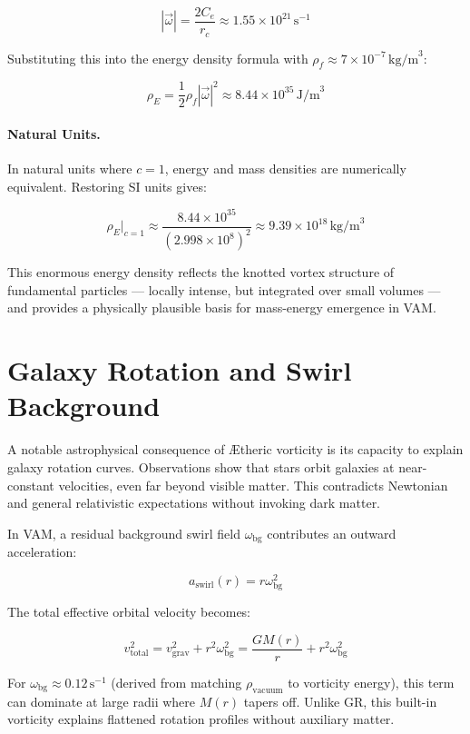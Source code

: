 \documentclass[12pt]{article}
\begin{document}
    \[
        |\vec{\omega}| = \frac{2 C_e}{r_c} \approx 1.55 \times 10^{21} \, \text{s}^{-1}
    \]

    Substituting this into the energy density formula with \( \rho_{\!f} \approx 7 \times 10^{-7} \, \text{kg/m}^3 \):

    \[
        \rho_{\scriptscriptstyle\boldsymbol\!E} = \frac{1}{2} \rho_{\!f} |\vec{\omega}|^2 \approx 8.44 \times 10^{35} \, \text{J/m}^3
    \]

    \paragraph{Natural Units.}
    In natural units where \( c = 1 \), energy and mass densities are numerically equivalent. Restoring SI units gives:

    \[
        \rho_{\scriptscriptstyle\boldsymbol\!E} \Big|_{c=1} \approx \frac{8.44 \times 10^{35}}{(2.998 \times 10^8)^2} \approx 9.39 \times 10^{18} \, \text{kg/m}^3
    \]

    This enormous energy density reflects the knotted vortex structure of fundamental particles — locally intense, but integrated over small volumes — and provides a physically plausible basis for mass-energy emergence in VAM.


    \section{Galaxy Rotation and Swirl Background}

    A notable astrophysical consequence of \AE{}theric vorticity is its capacity to explain galaxy rotation curves. Observations show that stars orbit galaxies at near-constant velocities, even far beyond visible matter. This contradicts Newtonian and general relativistic expectations without invoking dark matter.

    In VAM, a residual background swirl field $\omega_{\text{bg}}$ contributes an outward acceleration:

    \[
        a_{\text{swirl}}(r) = r \omega_{\text{bg}}^2
    \]

    The total effective orbital velocity becomes:

    \[
        v_{\text{total}}^2 = v_{\text{grav}}^2 + r^2 \omega_{\text{bg}}^2 = \frac{G M(r)}{r} + r^2 \omega_{\text{bg}}^2
    \]

    For $\omega_{\text{bg}} \approx 0.12 \, \text{s}^{-1}$ (derived from matching $\rho_{\text{vacuum}}$ to vorticity energy), this term can dominate at large radii where $M(r)$ tapers off. Unlike GR, this built-in vorticity explains flattened rotation profiles without auxiliary matter.
\end{document}
